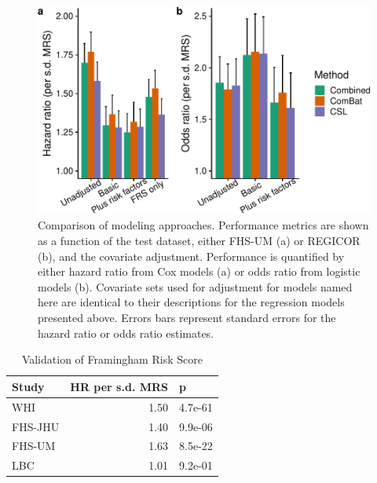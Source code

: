\documentclass[]{article}
\begin{document}
\begin{figure}[h]
\includegraphics{figures/csl-comparison-1} \caption{Comparison of modeling approaches. Performance metrics are shown as a function of the test dataset, either FHS-UM (a) or REGICOR (b), and the covariate adjustment. Performance is quantified by either hazard ratio from Cox models (a) or odds ratio from logistic models (b). Covariate sets used for adjustment for models named here are identical to their descriptions for the regression models presented above. Errors bars represent standard errors for the hazard ratio or odds ratio estimates.}\label{fig:csl-comparison}
\end{figure}

\begin{longtable}{lrl}
\caption{\label{tab:risk-score-validation}Validation of Framingham Risk Score}\\
\toprule
Study & HR per s.d. MRS & p\\
\midrule
WHI & 1.50 & 4.7e-61\\
FHS-JHU & 1.40 & 9.9e-06\\
FHS-UM & 1.63 & 8.5e-22\\
LBC & 1.01 & 9.2e-01\\
\bottomrule
\end{longtable}

\newpage
\end{document}
